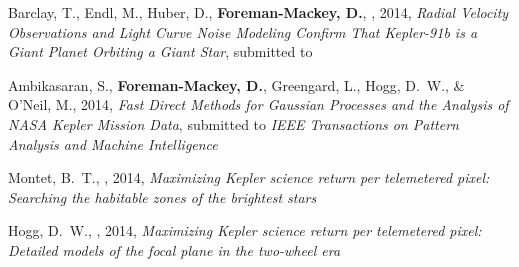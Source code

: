 \item Barclay, T., Endl, M.,  Huber, D., {\bf Foreman-Mackey, D.}, \etal, 2014,
    \emph{Radial Velocity Observations and Light Curve Noise Modeling Confirm
          That Kepler-91b is a Giant Planet Orbiting a Giant Star},
    submitted to \apj\ 

\item Ambikasaran, S., {\bf Foreman-Mackey, D.}, Greengard, L., Hogg, D.~W.,
    \& O'Neil, M., 2014,
    \emph{Fast Direct Methods for Gaussian Processes and the Analysis of NASA
          Kepler Mission Data},
    submitted to \emph{IEEE Transactions on Pattern Analysis and Machine
        Intelligence}

\item Montet, B.~T., \etal, 2014,
    \emph{Maximizing Kepler science return per telemetered pixel: Searching
          the habitable zones of the brightest stars}

\item Hogg, D.~W., \etal, 2014,
    \emph{Maximizing Kepler science return per telemetered pixel: Detailed
          models of the focal plane in the two-wheel era}
